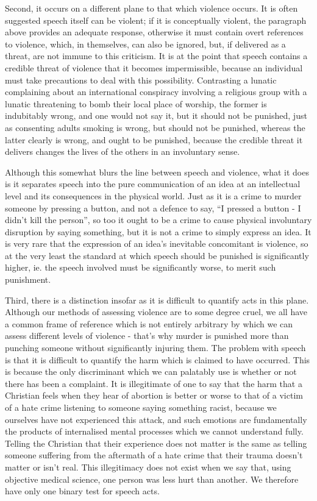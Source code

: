 \documentclass[10pt,a4paper,twoside]{article}
\begin{document}
\begin{multicols}{2}
Second, it occurs on a different plane to that which violence occurs. It
is often suggested speech itself can be violent; if it is conceptually
violent, the paragraph above provides an adequate response, otherwise it
must contain overt references to violence, which, in themselves, can
also be ignored, but, if delivered as a threat, are not immune to this
criticism. It is at the point that speech contains a credible threat of
violence that it becomes impermissible, because an individual must take
precautions to deal with this possibility. Contrasting a lunatic
complaining about an international conspiracy involving a religious
group with a lunatic threatening to bomb their local place of worship,
the former is indubitably wrong, and one would not say it, but it should
not be punished, just as consenting adults smoking is wrong, but should
not be punished, whereas the latter clearly is wrong, and ought to be
punished, because the credible threat it delivers changes the lives of
the others in an involuntary sense.

Although this somewhat blurs the line between speech and violence, what
it does is it separates speech into the pure communication of an idea at
an intellectual level and its consequences in the physical world. Just
as it is a crime to murder someone by pressing a button, and not a
defence to say, ``I pressed a button - I didn't kill the person'', so
too it ought to be a crime to cause physical involuntary disruption by
saying something, but it is not a crime to simply express an idea. It is
very rare that the expression of an idea's inevitable concomitant is
violence, so at the very least the standard at which speech should be
punished is significantly higher, ie. the speech involved must be
significantly worse, to merit such punishment.

Third, there is a distinction insofar as it is difficult to quantify
acts in this plane. Although our methods of assessing violence are to
some degree cruel, we all have a common frame of reference which is not
entirely arbitrary by which we can assess different levels of violence -
that's why murder is punished more than punching someone without
significantly injuring them. The problem with speech is that it is
difficult to quantify the harm which is claimed to have occurred. This
is because the only discriminant which we can palatably use is whether
or not there has been a complaint. It is illegitimate of one to say that
the harm that a Christian feels when they hear of abortion is better or
worse to that of a victim of a hate crime listening to someone saying
something racist, because we ourselves have not experienced this attack,
and such emotions are fundamentally the products of internalised mental
processes which we cannot understand fully. Telling the Christian that
their experience does not matter is the same as telling someone
suffering from the aftermath of a hate crime that their trauma doesn't
matter or isn't real. This illegitimacy does not exist when we say that,
using objective medical science, one person was less hurt than another.
We therefore have only one binary test for speech acts.


\end{multicols}
\end{document}
